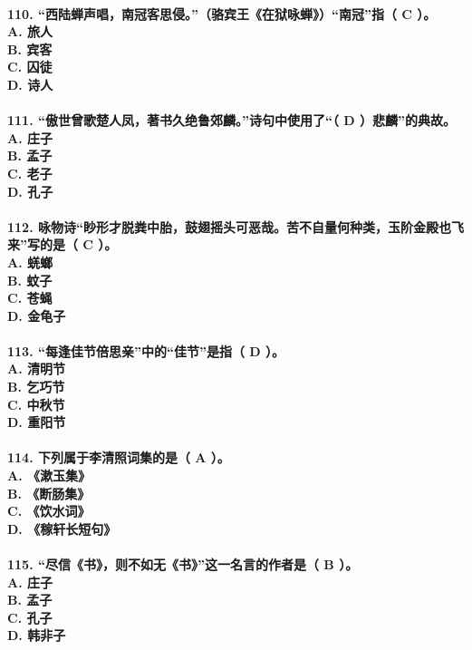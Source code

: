 \documentclass[UTF8]{ctexart} %
\begin{document}
\paragraph{
110. “西陆蝉声唱，南冠客思侵。”（骆宾王《在狱咏蝉》）“南冠”指（ \color{red}C\color{black} ）。 \\
    A. 旅人 \\
    B. 宾客 \\
    C. 囚徒 \\
    D. 诗人
}
\paragraph{
111. “傲世曾歌楚人凤，著书久绝鲁郊麟。”诗句中使用了“（ \color{red}D\color{black} ）悲麟”的典故。 \\
    A. 庄子 \\
    B. 孟子 \\
    C. 老子 \\
    D. 孔子
}
\paragraph{
112. 咏物诗“眇形才脱粪中胎，鼓翅摇头可恶哉。苦不自量何种类，玉阶金殿也飞来”写的是（ \color{red}C\color{black} ）。 \\
    A. 蜣螂 \\
    B. 蚊子 \\
    C. 苍蝇 \\
    D. 金龟子
}
\paragraph{
113. “每逢佳节倍思亲”中的“佳节”是指（ \color{red}D\color{black} ）。 \\
    A. 清明节 \\
    B. 乞巧节 \\
    C. 中秋节 \\
    D. 重阳节
}
\paragraph{
114. 下列属于李清照词集的是（ \color{red}A\color{black} ）。 \\
    A. 《漱玉集》 \\
    B. 《断肠集》 \\
    C. 《饮水词》 \\
    D. 《稼轩长短句》
}
\paragraph{
115. “尽信《书》，则不如无《书》”这一名言的作者是（ \color{red}B\color{black} ）。 \\
    A. 庄子 \\
    B. 孟子 \\
    C. 孔子 \\
    D. 韩非子
}
\end{document}
